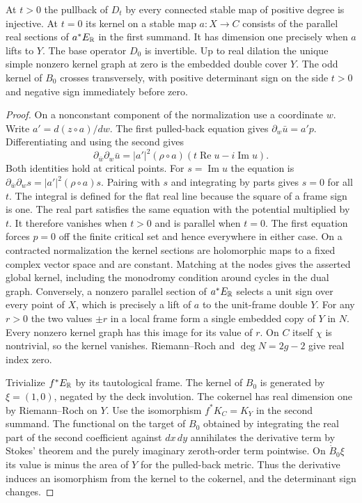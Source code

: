 \begin{proposition}\label{prop:model}
At $t>0$ the pullback of $D_t$ by every connected stable map of positive
degree is injective. At $t=0$ its kernel on a stable map $a:X\to C$
consists of the parallel real sections of $a^*E_{\mathbb R}$ in the first
summand. It has dimension one precisely when $a$ lifts to $Y$.
The base operator $D_0$ is invertible. Up to real dilation the unique
simple nonzero kernel graph at zero is the embedded double cover $Y$.
The odd kernel of $B_0$ crosses transversely, with positive determinant
sign on the side $t>0$ and negative sign immediately before zero.
\end{proposition}

\begin{proof}
On a nonconstant component of the normalization use a coordinate $w$.
Write $a'=d(z\circ a)/dw$. The first pulled-back equation gives
$\partial_w\bar u=a'p$. Differentiating and using the second gives
\begin{equation}\label{eq:scalar-model}
 \partial_{\bar w}\partial_w\bar u
    =|a'|^2(\rho\circ a)(t\operatorname{Re}u-i\operatorname{Im}u).
\end{equation}
Both identities hold at critical points. For $s=\operatorname{Im}u$
the equation is $\partial_{\bar w}\partial_w s=|a'|^2(\rho\circ a)s$.
Pairing with $s$ and integrating by parts gives $s=0$ for all $t$.
The integral is defined for the flat real line because the square of a
frame sign is one. The real part satisfies the same equation with
the potential multiplied by $t$. It therefore vanishes when $t>0$
and is parallel when $t=0$. The first equation forces $p=0$ off the
finite critical set and hence everywhere in either case. On a
contracted normalization the kernel sections are holomorphic maps to
a fixed complex vector space and are constant. Matching at the nodes
gives the asserted global kernel, including the monodromy condition
around cycles in the dual graph. Conversely, a nonzero parallel
section of $a^*E_{\mathbb R}$ selects a unit sign over every point of $X$,
which is precisely a lift of $a$ to the unit-frame double $Y$.
For any $r>0$ the two values $\pm r$ in a local frame form a single
embedded copy of $Y$ in $N$. Every nonzero kernel graph has this image
for its value of $r$. On $C$ itself $\chi$ is nontrivial, so the
kernel vanishes. Riemann--Roch and $\deg N=2g-2$ give real index
zero.

Trivialize $f^*E_{\mathbb R}$ by its tautological frame. The kernel of
$B_0$ is generated by $\xi=(1,0)$, negated by the deck involution.
The cokernel has real dimension one by Riemann--Roch on $Y$.
Use the isomorphism $f^*K_C=K_Y$ in the second summand. The functional
on the target of $B_0$ obtained by integrating the real part of the
second coefficient against $dx\,dy$ annihilates the derivative term
by Stokes' theorem and the purely imaginary zeroth-order term
pointwise. On $\dot B_0\xi$ its value is minus the area of $Y$ for
the pulled-back metric. Thus the derivative induces an isomorphism
from the kernel to the cokernel, and the determinant sign changes.


\end{proof}
